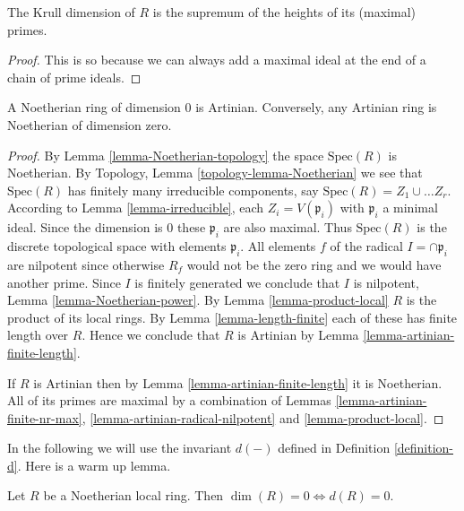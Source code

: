 \begin{lemma}
\label{lemma-dimension-height}
The Krull dimension of $R$ is the supremum of the
heights of its (maximal) primes.
\end{lemma}

\begin{proof}
This is so because we can always add a maximal ideal at the end of a chain
of prime ideals.
\end{proof}

\begin{lemma}
\label{lemma-Noetherian-dimension-0}
A Noetherian ring of dimension $0$ is Artinian.
Conversely, any Artinian ring is Noetherian of dimension zero.
\end{lemma}

\begin{proof}
By Lemma \ref{lemma-Noetherian-topology} the space $\text{Spec}(R)$
is Noetherian. By Topology, Lemma \ref{topology-lemma-Noetherian} we see
that $\text{Spec}(R)$ has finitely many irreducible
components, say $\text{Spec}(R) = Z_1 \cup \ldots Z_r$.
According to Lemma \ref{lemma-irreducible}, each $Z_i = V(\mathfrak p_i)$
with $\mathfrak p_i$ a minimal ideal. Since the dimension is $0$
these $\mathfrak p_i$ are also maximal. Thus $\text{Spec}(R)$
is the discrete topological space with elements $\mathfrak p_i$.
All elements $f$ of the radical $I = \cap \mathfrak p_i$
are nilpotent since otherwise $R_f$ would not be the zero ring
and we would have another prime. Since $I$ is finitely generated
we conclude that $I$ is nilpotent, Lemma \ref{lemma-Noetherian-power}.
By Lemma \ref{lemma-product-local} $R$ is the product of its
local rings. By Lemma \ref{lemma-length-finite} each of these
has finite length over $R$. Hence we conclude that $R$
is Artinian by Lemma \ref{lemma-artinian-finite-length}.

\medskip\noindent
If $R$ is Artinian then by Lemma \ref{lemma-artinian-finite-length}
it is Noetherian. All of its primes are maximal by a combination
of Lemmas \ref{lemma-artinian-finite-nr-max},
\ref{lemma-artinian-radical-nilpotent} and \ref{lemma-product-local}.
\end{proof}

\noindent
In the following we will use the invariant $d(-)$ defined
in Definition \ref{definition-d}. Here is a warm up lemma.

\begin{lemma}
\label{lemma-dimension-0-d-0}
Let $R$ be a Noetherian local ring.
Then $\dim(R) = 0 \Leftrightarrow d(R) = 0$.
\end{lemma}

